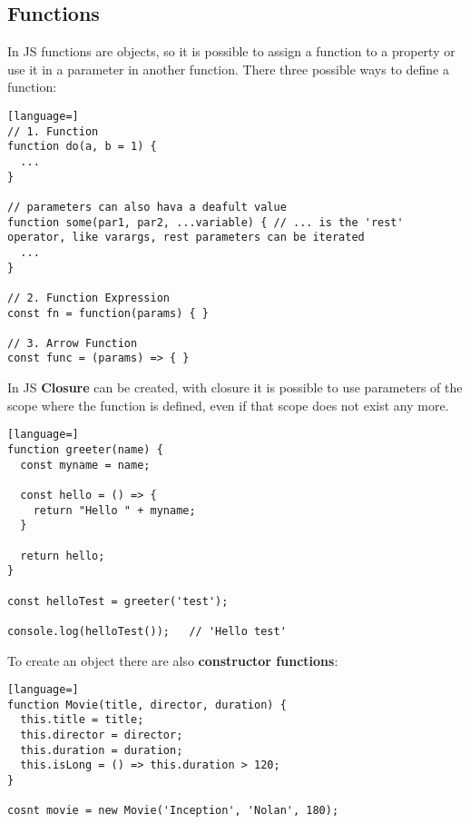 \documentclass[12pt]{article}
\begin{document}
\subsection{Functions}
In JS functions are objects, so it is possible to assign a function to a property or use it in a parameter in another function. There three possible ways to define a function:
\begin{lstlisting}[language=]
// 1. Function
function do(a, b = 1) {
  ...
}

// parameters can also hava a deafult value
function some(par1, par2, ...variable) { // ... is the 'rest' operator, like varargs, rest parameters can be iterated
  ...
}

// 2. Function Expression
const fn = function(params) { }

// 3. Arrow Function
const func = (params) => { }
\end{lstlisting}
In JS \textbf{Closure} can be created, with closure it is possible to use parameters of the scope where the function is defined, even if that scope does not exist any more.
\begin{lstlisting}[language=]
function greeter(name) {
  const myname = name;

  const hello = () => {
    return "Hello " + myname;
  }

  return hello;
}

const helloTest = greeter('test');

console.log(helloTest());   // 'Hello test'
\end{lstlisting}
To create an object there are also \textbf{constructor functions}:
\begin{lstlisting}[language=]
function Movie(title, director, duration) {
  this.title = title;
  this.director = director;
  this.duration = duration;
  this.isLong = () => this.duration > 120;
}

cosnt movie = new Movie('Inception', 'Nolan', 180);
\end{lstlisting}
\end{document}

